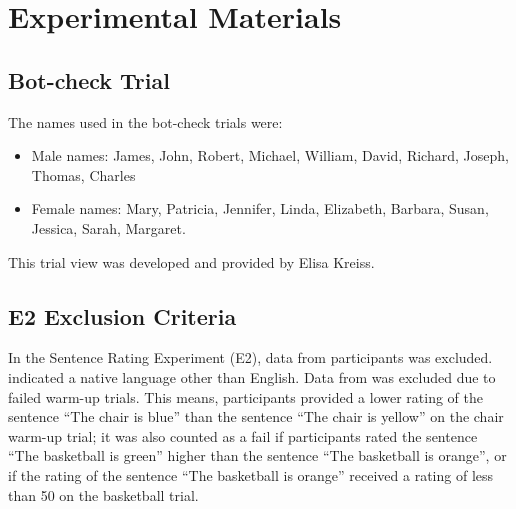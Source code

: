 \section{Experimental Materials}
\subsection{Bot-check Trial}
The names used in the bot-check trials were: 
\begin{itemize}
\item Male names: James, John, Robert, Michael, William, David, Richard, Joseph, Thomas, Charles 
\item Female names: Mary, Patricia, Jennifer, Linda, Elizabeth, Barbara, Susan, Jessica, Sarah, Margaret. 
\end{itemize}
This trial view was developed and provided by Elisa Kreiss. 
\subsection{E2 Exclusion Criteria}
In the Sentence Rating Experiment (E2), data from  participants was excluded.  indicated a native language other than English. Data from  was excluded due to failed warm-up trials. This means, participants provided a lower rating of the sentence “The chair is blue” than the sentence “The chair is yellow” on the chair warm-up trial; it was also counted as a fail if participants rated the sentence “The basketball is green” higher than the sentence “The basketball is orange”, or if the rating of the sentence “The basketball is orange” received a rating of less than 50 on the basketball trial.

